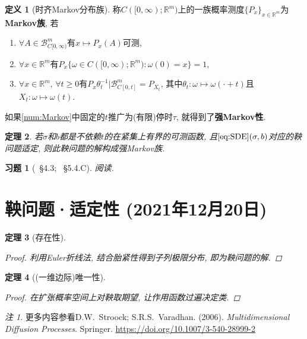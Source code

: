 \documentclass{ctexart}
\theoremstyle{definition}
\newtheorem{Def}{定义}[section]
\theoremstyle{remark}
\newtheorem*{ExRmk}{注}
\theoremstyle{plain}
\newtheorem{Thm}[Def]{定理}
\newtheorem{Ex}{习题}[section]
\newcommand{\1}{\mathbbm{1}}				%
\newcommand{\R}{\mathbb{R}}					%
\begin{document}
\begin{Def}[时齐Markov分布族]
称$C([0,\infty);\R^{m})$上的一族概率测度$\{ P_{x} \}_{x \in \R^{m}}$为\textbf{Markov族}, 若
\begin{enumerate}[\quad (i).]
	\item $\forall A \in \mathscr{B}_{C[0,\infty)}^{m}$有$x \mapsto P_{x}(A)$可测, 
	\item $\forall x \in \R^m$有$P_{x}\{ \omega \in C([0,\infty);\R^{m}) : \omega(0)=x \} = 1$, 
	\item\label{num:Markov} $\forall x \in \R^{m} ,\, \forall t \ge 0$有$P_{x}\theta_{t}^{-1}\vert\mathscr{B}_{C[0,t]}^{m} = P_{X_t}$, 其中$\theta_{t} : \omega \mapsto \omega(\bm{\cdot}+t)$且$X_{t} : \omega \mapsto \omega(t)$.
\end{enumerate}
如果\eqref{num:Markov}中固定的$t$推广为(有限)停时$\tau$, 就得到了\textbf{强Markov性}.
\end{Def}

\begin{Thm}
若$\sigma$和$b$都是不依赖$t$的在紧集上有界的可测函数, 且$\eqref{eq:SDE}(\sigma,b)$对应的鞅问题适定, 则此鞅问题的解构成强Markov族.
\end{Thm}


\begin{Ex}[\cite{龚光鲁-钱敏平}~\S4.3; \cite{Karatzas-Shreve--GTM113}~\S5.4.C]
阅读.
\end{Ex}



\section{鞅问题·适定性 \normalfont\footnotesize (2021年12月20日)}
\begin{Thm}[存在性]
\begin{proof}
利用Euler折线法, 结合胎紧性得到子列极限分布, 即为鞅问题的解.
\end{proof}
\end{Thm}

\begin{Thm}[(一维边际)唯一性]
\begin{proof}
在扩张概率空间上对鞅取期望, 让作用函数过遍决定类.
\end{proof}
\end{Thm}


\begin{ExRmk}
更多内容参看D.W.~Stroock; S.R.S.~Varadhan. (2006). \emph{Multidimensional Diffusion Processes}. Springer. \url{https://doi.org/10.1007/3-540-28999-2}
\end{ExRmk}
\end{document}
